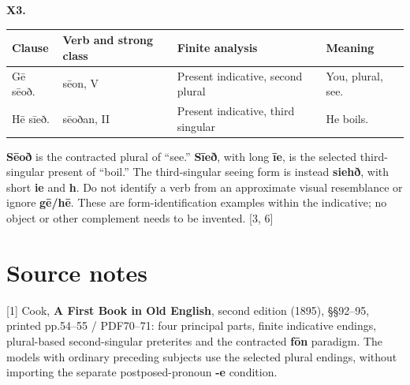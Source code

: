 \par\begin{minipage}{\linewidth}\raggedright
\textbf{X3.}

\par\begingroup
\fontsize{10.5}{13.2}\selectfont
\setlength{\LTleft}{0pt}\setlength{\LTright}{\fill}
\noindent
\begin{tabular}{@{}>{\raggedright\arraybackslash}p{20.58mm}>{\raggedright\arraybackslash}p{27.37mm}>{\raggedright\arraybackslash}p{43.94mm}>{\raggedright\arraybackslash}p{23.67mm}@{}}
\toprule
\textbf{Clause} & \textbf{Verb and strong class} & \textbf{Finite analysis} & \textbf{Meaning} \\
\midrule
Gē sēoð. & sēon, V & Present indicative, second plural & You, plural, see. \\
Hē sīeð. & sēoðan, II & Present indicative, third singular & He boils. \\
\bottomrule
\end{tabular}
\par\endgroup

\textbf{Sēoð} is the contracted plural of “see.” \textbf{Sīeð}, with long \textbf{īe}, is the selected third-singular present of “boil.” The third-singular seeing form is instead \textbf{siehð}, with short \textbf{ie} and \textbf{h}. Do not identify a verb from an approximate visual resemblance or ignore \textbf{gē/\allowbreak{}hē}. These are form-identification examples within the indicative; no object or other complement needs to be invented. [3, 6]

\end{minipage}\par\addvspace{4pt}

\clearpage
\section*{Source notes}

\begingroup\fontsize{10}{12.8}\selectfont
[1] Cook, \textbf{A First Book in Old English}, second edition (1895), §§92–95, printed pp.54–55 /\allowbreak{} PDF70–71: four principal parts, finite indicative endings, plural-based second-singular preterites and the contracted \textbf{fōn} paradigm. The models with ordinary preceding subjects use the selected plural endings, without importing the separate postposed-pronoun \textbf{-e} condition.

